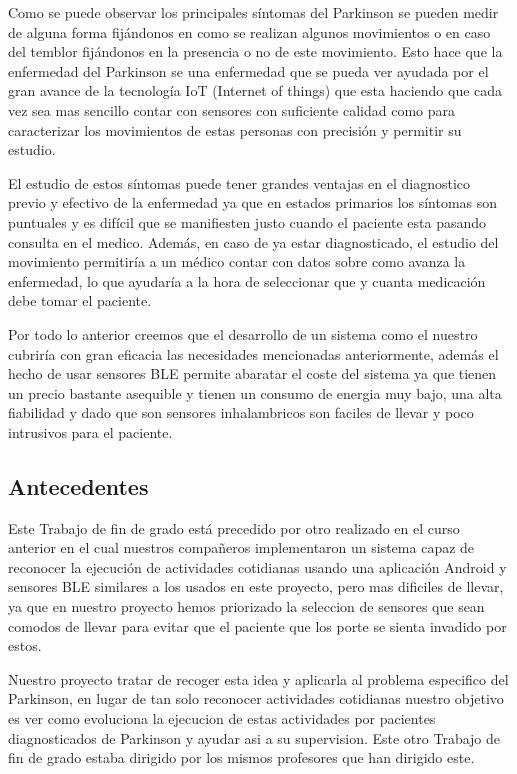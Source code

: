 \documentclass[11pt,spanish]{article}
\begin{document}
Como se puede observar los principales síntomas del Parkinson se pueden medir de alguna forma fijándonos en como se realizan algunos movimientos o en caso del temblor fijándonos en la presencia o no de este movimiento. Esto hace que la enfermedad del Parkinson se una enfermedad que se pueda ver ayudada por el gran avance de la tecnología IoT (Internet of things) que esta haciendo que cada vez sea mas sencillo contar con sensores con suficiente calidad como para caracterizar los movimientos de estas personas con precisión y permitir su estudio.
\newline

El estudio de estos síntomas puede tener grandes ventajas en el diagnostico previo y efectivo de la enfermedad ya que en estados primarios los síntomas son puntuales y es difícil que se manifiesten justo cuando el paciente esta pasando consulta en el medico. Además, en caso de ya estar diagnosticado, el estudio del movimiento permitiría a un médico contar con datos sobre como avanza la enfermedad, lo que ayudaría a la hora de seleccionar que y cuanta medicación debe tomar el paciente.

Por todo lo anterior creemos que el desarrollo de un sistema como el nuestro cubriría con gran eficacia las necesidades mencionadas anteriormente, además el hecho de usar sensores BLE permite abaratar el coste del sistema ya que tienen un precio bastante asequible y tienen un consumo de energia muy bajo, una alta fiabilidad y dado que son sensores inhalambricos son faciles de llevar y poco intrusivos para el paciente.

\subsection{Antecedentes}

Este Trabajo de fin de grado está precedido por otro realizado en el curso anterior \cite{TFG_Anterior}  en el cual nuestros compañeros implementaron un sistema capaz de reconocer la ejecución de actividades cotidianas usando una aplicación Android y sensores BLE similares a los usados en este proyecto, pero mas dificiles de llevar, ya que en nuestro proyecto hemos priorizado la seleccion de sensores que sean comodos de llevar para evitar que el paciente que los porte se sienta invadido por estos. 
\newline

Nuestro proyecto tratar de recoger esta idea y aplicarla al problema especifico del Parkinson, en lugar de tan solo reconocer actividades cotidianas nuestro objetivo es ver como evoluciona la ejecucion de estas actividades por pacientes diagnosticados de Parkinson y ayudar asi a su supervision. Este otro Trabajo de fin de grado estaba dirigido por los mismos profesores que han dirigido este.
\newline
\end{document}
